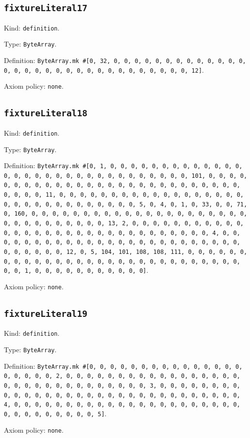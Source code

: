 \documentclass[11pt]{article}
\begin{document}
\subsection*{\texttt{fixtureLiteral17}}
\noindent Kind: \texttt{definition}.\par
\noindent Type: \texttt{ByteArray}.\par
\noindent Definition: \texttt{ByteArray.mk \#[0, 32, 0, 0, 0, 0, 0, 0, 0, 0, 0, 0, 0, 0, 0, 0, 0, 0, 0, 0, 0, 0, 0, 0, 0, 0, 0, 0, 0, 0, 0, 0, 0, 12]}.\par
\noindent Axiom policy: \texttt{none}.\par
\subsection*{\texttt{fixtureLiteral18}}
\noindent Kind: \texttt{definition}.\par
\noindent Type: \texttt{ByteArray}.\par
\noindent Definition: \texttt{ByteArray.mk \#[0, 1, 0, 0, 0, 0, 0, 0, 0, 0, 0, 0, 0, 0, 0, 0, 0, 0, 0, 0, 0, 0, 0, 0, 0, 0, 0, 0, 0, 0, 0, 0, 0, 101, 0, 0, 0, 0, 0, 0, 0, 0, 0, 0, 0, 0, 0, 0, 0, 0, 0, 0, 0, 0, 0, 0, 0, 0, 0, 0, 0, 0, 0, 0, 0, 11, 0, 0, 0, 0, 0, 0, 0, 0, 0, 0, 0, 0, 0, 0, 0, 0, 0, 0, 0, 0, 0, 0, 0, 0, 0, 0, 0, 0, 0, 0, 0, 5, 0, 4, 0, 1, 0, 33, 0, 0, 71, 0, 160, 0, 0, 0, 0, 0, 0, 0, 0, 0, 0, 0, 0, 0, 0, 0, 0, 0, 0, 0, 0, 0, 0, 0, 0, 0, 0, 0, 0, 0, 0, 0, 13, 2, 0, 0, 0, 0, 0, 0, 0, 0, 0, 0, 0, 0, 0, 0, 0, 0, 0, 0, 0, 0, 0, 0, 0, 0, 0, 0, 0, 0, 0, 0, 0, 4, 0, 0, 0, 0, 0, 0, 0, 0, 0, 0, 0, 0, 0, 0, 0, 0, 0, 0, 0, 0, 0, 0, 0, 0, 0, 0, 0, 0, 0, 0, 0, 12, 0, 5, 104, 101, 108, 108, 111, 0, 0, 0, 0, 0, 0, 0, 0, 0, 0, 0, 0, 0, 0, 0, 0, 0, 0, 0, 0, 0, 0, 0, 0, 0, 0, 0, 0, 0, 0, 0, 1, 0, 0, 0, 0, 0, 0, 0, 0, 0, 0, 0]}.\par
\noindent Axiom policy: \texttt{none}.\par
\subsection*{\texttt{fixtureLiteral19}}
\noindent Kind: \texttt{definition}.\par
\noindent Type: \texttt{ByteArray}.\par
\noindent Definition: \texttt{ByteArray.mk \#[0, 0, 0, 0, 0, 0, 0, 0, 0, 0, 0, 0, 0, 0, 0, 0, 0, 0, 0, 0, 2, 0, 0, 0, 0, 0, 0, 0, 0, 0, 0, 0, 0, 0, 0, 0, 0, 0, 0, 0, 0, 0, 0, 0, 0, 0, 0, 0, 0, 0, 0, 0, 3, 0, 0, 0, 0, 0, 0, 0, 0, 0, 0, 0, 0, 0, 0, 0, 0, 0, 0, 0, 0, 0, 0, 0, 0, 0, 0, 0, 0, 0, 0, 0, 4, 0, 0, 0, 0, 0, 0, 0, 0, 0, 0, 0, 0, 0, 0, 0, 0, 0, 0, 0, 0, 0, 0, 0, 0, 0, 0, 0, 0, 0, 0, 0, 5]}.\par
\noindent Axiom policy: \texttt{none}.\par
\end{document}
